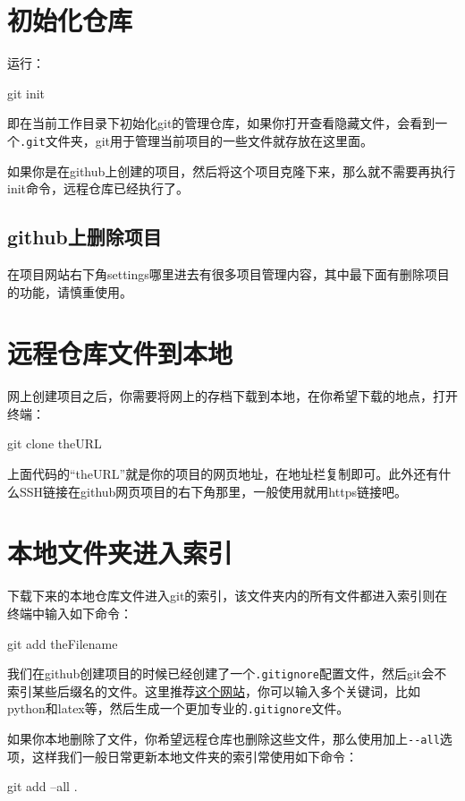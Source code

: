\documentclass[11pt,oneside]{book}
\begin{document}
\section{初始化仓库}
运行：
\begin{tcbbash}[]
git init
\end{tcbbash}
即在当前工作目录下初始化git的管理仓库，如果你打开查看隐藏文件，会看到一个\verb+.git+文件夹，git用于管理当前项目的一些文件就存放在这里面。

如果你是在github上创建的项目，然后将这个项目克隆下来，那么就不需要再执行init命令，远程仓库已经执行了。

\subsection{github上删除项目}
在项目网站右下角settings哪里进去有很多项目管理内容，其中最下面有删除项目的功能，请慎重使用。


\section{远程仓库文件到本地}
网上创建项目之后，你需要将网上的存档下载到本地，在你希望下载的地点，打开终端：
\begin{tcbbash}[]
git clone theURL
\end{tcbbash}
上面代码的“theURL”就是你的项目的网页地址，在地址栏复制即可。此外还有什么SSH链接在github网页项目的右下角那里，一般使用就用https链接吧。



\section{本地文件夹进入索引}
下载下来的本地仓库文件进入git的索引，该文件夹内的所有文件都进入索引则在终端中输入如下命令：
\begin{tcbbash}[]
git add theFilename
\end{tcbbash}

我们在github创建项目的时候已经创建了一个\verb+.gitignore+配置文件，然后git会不索引某些后缀名的文件。这里推荐\href{https://www.gitignore.io/}{这个网站}，你可以输入多个关键词，比如python和latex等，然后生成一个更加专业的\verb+.gitignore+文件。

如果你本地删除了文件，你希望远程仓库也删除这些文件，那么使用加上\verb+--all+选项，这样我们一般日常更新本地文件夹的索引常使用如下命令：

\begin{tcbbash}[]
git  add  --all   .  
\end{tcbbash}
\end{document}
